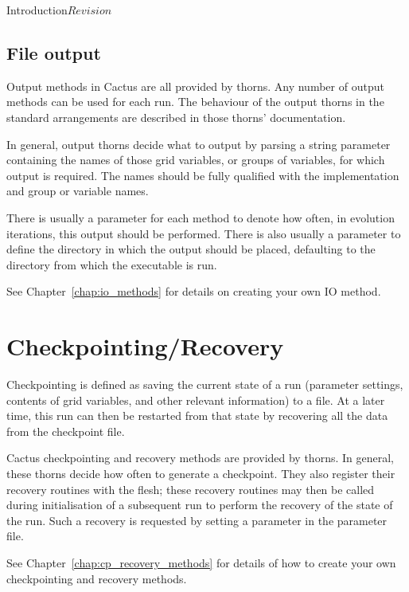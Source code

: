 \begin{cactuspart}{Introduction}{}{$Revision$}
\begin{Lentry}
\end{Lentry}


\section{File output}
Output methods in Cactus are all provided by thorns.
Any number of output methods can be used for each run.
The behaviour of the output thorns in the
standard arrangements are described in those thorns' documentation.

In general, output thorns decide what to output by parsing a string parameter
containing the names of those grid variables, or groups of variables, for which
output is required. The names should be fully qualified with the
implementation and group or variable names.

There is usually a parameter for each method to denote how often, in evolution
iterations, this output should be performed.  There is also usually a parameter
to define the directory in which the output should be placed, defaulting to the
directory from which the executable is run.

See Chapter~\ref{chap:io_methods} for details on creating your own IO method.



\chapter{Checkpointing/Recovery}
\label{sec:checkpointing}

Checkpointing is defined as saving the current state of a run (parameter
settings, contents of grid variables, and other relevant information) to a file.
At a later time, this run can then be restarted from that state by recovering
all the data from the checkpoint file.

Cactus checkpointing and recovery methods are provided by thorns.
In general, these thorns decide how often to generate a checkpoint.
They also register their recovery routines with the flesh; these recovery
routines may then be called during initialisation of a subsequent run to
perform the recovery of the state of the run.
Such a recovery is requested by setting a parameter in the parameter file.

See Chapter~\ref{chap:cp_recovery_methods} for details of how to create
your own checkpointing and recovery methods.



\end{cactuspart}
